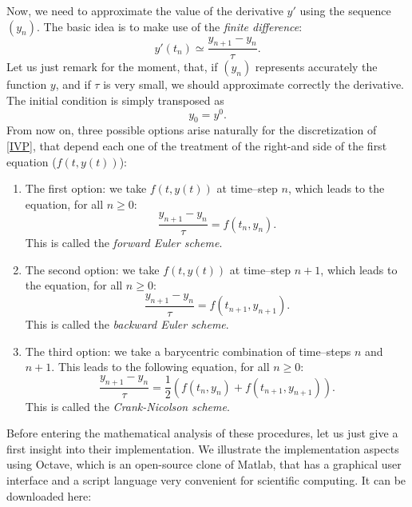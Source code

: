 \documentclass{article}
\begin{document}

Now, we need to approximate the value of the derivative $y'$ using the sequence $(y_n)$. The basic idea is to make use of the \emph{finite difference}:
\[
y'(t_n) \simeq \frac{y_{n+1} - y_n}{\tau}.
\]
Let us just remark for the moment, that, if $(y_n)$ represents accurately the function $y$, and if $\tau$ is very small, we should approximate correctly the derivative. The initial condition is simply transposed as 
\[
y_0 = y^0.
\]
From now on, three possible options arise naturally for the discretization of \eqref{IVP}, that depend each one of the treatment of the right-and side of the first equation ($f(t,y(t))$):

\begin{enumerate}
    \item The first option: we take $f(t,y(t))$ at time--step $n$, which leads to the equation, for all $n\geq0$:
    \begin{equation} \label{fEuler}
        \frac{y_{n+1} - y_n}{\tau} = f(t_n,y_n).
    \end{equation}
    This is called the \emph{forward Euler scheme}.
    
    \item The second option: we take
    $f(t,y(t))$ at time--step $n+1$, which
    leads to the equation, for all $n\geq0$:
    \begin{equation} \label{bEuler}
        \frac{y_{n+1} - y_n}{\tau} = f(t_{n+1},y_{n+1}).
    \end{equation}
    This is called the \emph{backward Euler scheme}.
    
    \item The third option: we take
    a barycentric combination of time--steps $n$ and $n+1$. This leads to the following equation, for all $n\geq0$:
    \begin{equation} \label{CN}
        \frac{y_{n+1} - y_n}{\tau} = \frac12 (f(t_{n},y_{n}) +
        f(t_{n+1},y_{n+1})).
    \end{equation}
    This is called the \emph{Crank-Nicolson scheme}.
\end{enumerate}


Before entering the mathematical analysis of these procedures, let us just give a first insight into their implementation. We illustrate the implementation aspects using Octave, which is an open-source clone of Matlab, that has a graphical user interface and a script language very convenient for scientific computing. It can be downloaded here:
\end{document}
